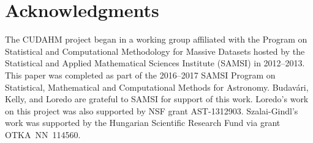 \documentclass[12pt]{article}
\numberwithin{equation}{section}
\numberwithin{figure}{section}
\numberwithin{table}{section}
\newcommand\enote[1]{{$\bullet\bullet\bullet$}{\sl [#1]}{$\bullet\bullet\bullet$}}
\begin{document}
\newpage {} %





%


%




\section*{Acknowledgments}

The CUDAHM project began in a working group affiliated with the Program on Statistical and Computational Methodology for Massive Datasets hosted by the Statistical and Applied Mathematical Sciences Institute (SAMSI) in 2012--2013.
This paper was completed as part of the 2016--2017 SAMSI Program on Statistical, Mathematical and Computational Methods for Astronomy.
Budav\'ari, Kelly, and Loredo are grateful to SAMSI for support of this work.
Loredo's work on this project was also supported by NSF grant AST-1312903.
Szalai-Gindl's work was supported by the Hungarian Scientific Research Fund via grant OTKA~NN~114560.


% 




\end{document}

